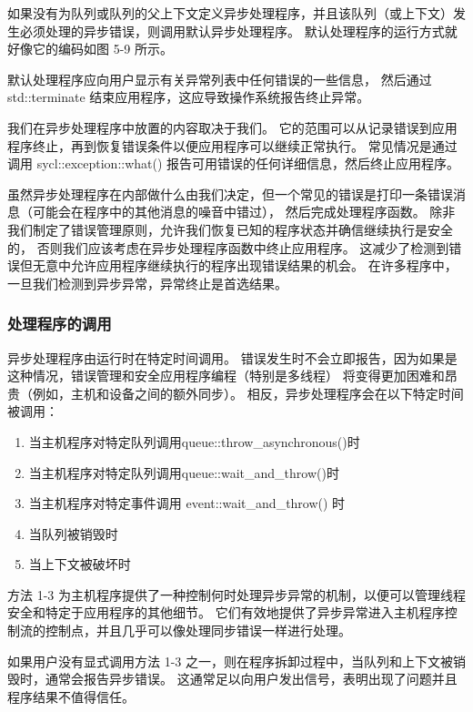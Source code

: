 如果没有为队列或队列的父上下文定义异步处理程序，并且该队列（或上下文）发生必须处理的异步错误，则调用默认异步处理程序。 
默认处理程序的运行方式就好像它的编码如图 5-9 所示。

默认处理程序应向用户显示有关异常列表中任何错误的一些信息，
然后通过 std::terminate 结束应用程序，这应导致操作系统报告终止异常。

我们在异步处理程序中放置的内容取决于我们。 
它的范围可以从记录错误到应用程序终止，再到恢复错误条件以便应用程序可以继续正常执行。 
常见情况是通过调用 sycl::exception::what() 报告可用错误的任何详细信息，然后终止应用程序。

虽然异步处理程序在内部做什么由我们决定，但一个常见的错误是打印一条错误消息（可能会在程序中的其他消息的噪音中错过），
然后完成处理程序函数。 除非我们制定了错误管理原则，允许我们恢复已知的程序状态并确信继续执行是安全的，
否则我们应该考虑在异步处理程序函数中终止应用程序。 
这减少了检测到错误但无意中允许应用程序继续执行的程序出现错误结果的机会。 
在许多程序中，一旦我们检测到异步异常，异常终止是首选结果。

\subsubsection{处理程序的调用}
异步处理程序由运行时在特定时间调用。 
错误发生时不会立即报告，因为如果是这种情况，错误管理和安全应用程序编程（特别是多线程）
将变得更加困难和昂贵（例如，主机和设备之间的额外同步）。 相反，异步处理程序会在以下特定时间被调用：

\begin{enumerate}
	\item 当主机程序对特定队列调用queue::throw\_asynchronous()时

	\item 当主机程序对特定队列调用queue::wait\_and\_throw()时

	\item 当主机程序对特定事件调用 event::wait\_and\_throw() 时

	\item 当队列被销毁时

	\item 当上下文被破坏时
\end{enumerate}

方法 1-3 为主机程序提供了一种控制何时处理异步异常的机制，以便可以管理线程安全和特定于应用程序的其他细节。 
它们有效地提供了异步异常进入主机程序控制流的控制点，并且几乎可以像处理同步错误一样进行处理。

如果用户没有显式调用方法 1-3 之一，则在程序拆卸过程中，当队列和上下文被销毁时，通常会报告异步错误。 
这通常足以向用户发出信号，表明出现了问题并且程序结果不值得信任。

